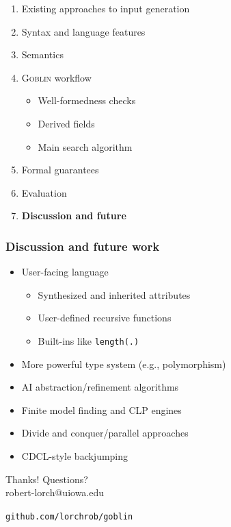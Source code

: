 \documentclass[11pt,xcolor={dvipsnames},hyperref={pdftex,pdfpagemode=UseNone,hidelinks,pdfdisplaydoctitle=true},usepdftitle=false]{beamer}
\newcommand{\system}{\textsc{Goblin}}
\newcommand{\green}[1]{\textcolor{green!60!black}{#1}}
\newcommand{\blue}[1]{\textcolor{blue!70!black}{#1}}
\begin{document}
\begin{frame}
\begin{enumerate}
  \item Existing approaches to input generation
  \item Syntax and language features
  \item Semantics
  \item \system{} workflow
  \begin{itemize}
    \item Well-formedness checks
    \item Derived fields
    \item Main search algorithm
  \end{itemize}
  \item Formal guarantees
  \item Evaluation
  \item \green{\textbf{Discussion and future}}
\end{enumerate}
\end{frame}

\begin{frame}
    \frametitle{Discussion and future work}
    \begin{itemize}
        \item User-facing language 
        \begin{itemize} 
        \item \green{Synthesized} and \green{inherited attributes}
        \item User-defined \green{recursive functions} 
        \item Built-ins like \blue{{\scriptsize\texttt{length(.)}}}
        \end{itemize} \pause
        \item More powerful type system (e.g., \green{polymorphism})\pause
        \item AI \green{abstraction/refinement} algorithms\pause
        \item \green{Finite model finding} and \green{CLP} engines \pause
        \item \green{Divide and conquer/parallel} approaches \pause
        \item CDCL-style \green{backjumping}
    \end{itemize}
\end{frame}

\begin{frame}
\center 
{\huge Thanks! Questions?}\\[12pt]

robert-lorch@uiowa.edu

\texttt{github.com/lorchrob/goblin}
\end{frame}
\end{document}
